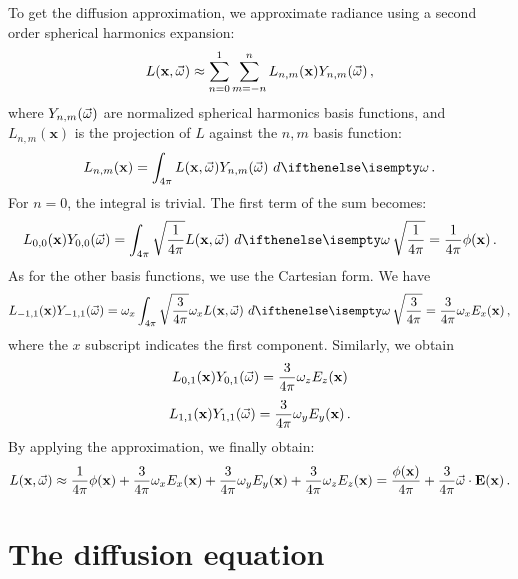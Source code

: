 \documentclass[10pt,a4paper]{article}
\begin{document}
To get the diffusion approximation, we approximate radiance using a second order spherical harmonics expansion:
$$
{L}(\mathbf{x}, \vec{\omega}) \approx \sum_{n = 0}^{1} \sum_{m = -n}^{n} L_{n,m}(\mathbf{x}) Y_{n,m}(\vec{\omega}) \, ,
$$
where $Y_{n,m}(\vec{\omega})$ are normalized spherical harmonics basis functions,
and $L_{n,m}(\mathbf{x})$ is the projection of $L$ against the $n,m$ basis function:
$$
L_{n,m}(\mathbf{x}) = \sphere{\xomegafunc{L} Y_{n,m}(\omegavec)}{} \, .
$$
For $n = 0$, the integral is trivial.  The first term of the sum becomes:
$$
L_{0,0}(\mathbf{x}) Y_{0,0}(\omegavec) = \sphere{\sqrt{\frac{1}{4\pi}} \xomegafunc{L}}{} \, \sqrt{\frac{1}{4\pi}} = \frac{1}{4\pi} \xfunc{\phi} \, .
$$
As for the other basis functions, we use the Cartesian form. We have
$$
L_{-1,1}(\mathbf{x}) Y_{-1,1}(\omegavec) = \omega_x \sphere{\sqrt{\frac{3}{4\pi}} \omega_x \xomegafunc{L}}{} \, \sqrt{\frac{3}{4\pi}} = \frac{3}{4\pi} \omega_x {E}_x(\mathbf{x}) \, ,
$$
where the $x$ subscript indicates the first component. Similarly, we obtain
$$
L_{0,1}(\mathbf{x}) Y_{0,1}(\vec{\omega}) = \frac{3}{4\pi} \omega_z {E}_z(\mathbf{x})
$$
$$
L_{1,1}(\mathbf{x}) Y_{1,1}(\vec{\omega}) = \frac{3}{4\pi} \omega_y {E}_y(\mathbf{x}) \, .
$$
By applying the approximation, we finally obtain:
$$
{L}(\mathbf{x}, \vec{\omega}) \approx \frac{1}{4\pi} {\phi}(\mathbf{x}) + \frac{3}{4\pi} \omega_x {E}_x(\mathbf{x}) + \frac{3}{4\pi} \omega_y {E}_y(\mathbf{x})+ \frac{3}{4\pi} \omega_z {E}_z(\mathbf{x}) = \frac{{\phi}(\mathbf{x})}{4\pi} + \frac{3}{4\pi} \vec{\omega} \cdot \mathbf{E}(\mathbf{x}) \, .
$$

\section{The diffusion equation}
\end{document}
